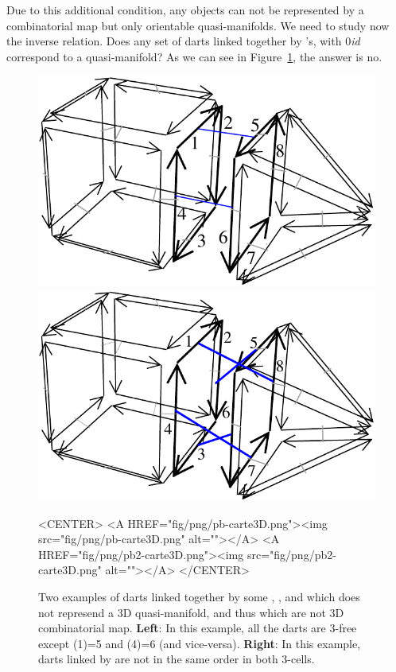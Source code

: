 
Due to this additional condition, any objects can not be represented
by a combinatorial map but only orientable quasi-manifolds. We need to
study now the inverse relation. Does any set of darts linked together by
\betai{}'s, with 0\myleq{}\emph{i}\myleq{}\emph{d} correspond to a quasi-manifold?  As
we can see in Figure~\ref{fig-pb-carte}, the answer is no.
%
\begin{figure}[ht]
  \begin{ccTexOnly}
    \begin{center}
      \includegraphics[width=.4\textwidth]
      {Combinatorial_map/fig/pdf/pb-carte3D}
      \qquad
      \includegraphics[width=.4\textwidth]
      {Combinatorial_map/fig/pdf/pb2-carte3D}
    \end{center}
  \end{ccTexOnly}
  \begin{ccHtmlOnly}
    <CENTER>
    <A HREF="fig/png/pb-carte3D.png"><img src="fig/png/pb-carte3D.png" alt=""></A>
    <A HREF="fig/png/pb2-carte3D.png"><img src="fig/png/pb2-carte3D.png" alt=""></A>
    </CENTER>
    \end{ccHtmlOnly}
    \caption{Two examples of darts linked together by some \betazero{},
      \betaun{}, \betadeux{} and \betatrois{} which does not represend a 3D
      quasi-manifold, and thus which are not 3D combinatorial map. 
      \textbf{Left}: In this example, all the darts are 3-free except
      \betatrois{}(1)=5 and \betatrois{}(4)=6 (and vice-versa).
      \textbf{Right}: In this example, darts linked by \betatrois{} 
      are not in the same order in both 3-cells.
    }
    \label{fig-pb-carte}
\end{figure}

